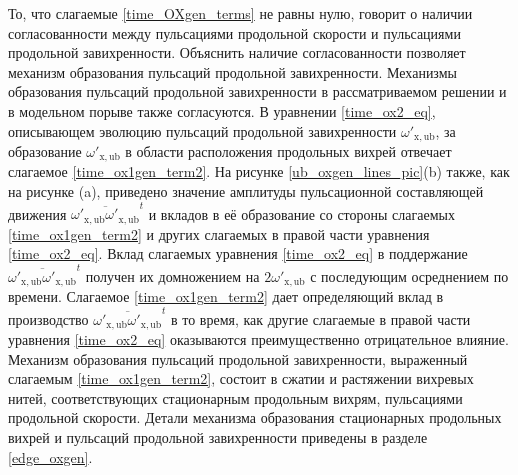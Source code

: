 То, что слагаемые \eqref{time_OXgen_terms} не равны нулю, говорит о наличии согласованности между пульсациями продольной скорости и пульсациями продольной завихренности. Объяснить наличие согласованности позволяет механизм образования пульсаций продольной завихренности. Механизмы образования пульсаций продольной завихренности в рассматриваемом решении и в модельном порыве также согласуются. В уравнении \eqref{time_ox2_eq}, описывающем эволюцию пульсаций продольной завихренности $\omega'_\mathrm{x,ub}$, за образование $\omega'_\mathrm{x,ub}$ в области расположения продольных вихрей отвечает слагаемое \eqref{time_ox1gen_term2}. На рисунке \ref{ub_oxgen_lines_pic}(b) также, как на рисунке (a), приведено значение амплитуды пульсационной составляющей движения $\overline{\omega'_\mathrm{x,ub}\omega'_\mathrm{x,ub}}^t$ и вкладов в её образование со стороны слагаемых \eqref{time_ox1gen_term2} и других слагаемых в правой части уравнения \eqref{time_ox2_eq}. Вклад слагаемых уравнения \eqref{time_ox2_eq} в поддержание $\overline{\omega'_\mathrm{x,ub}\omega'_\mathrm{x,ub}}^t$ получен их домножением на $2\omega'_\mathrm{x,ub}$ с последующим осреднением по времени. Слагаемое \eqref{time_ox1gen_term2} дает определяющий вклад в производство  $\overline{\omega'_\mathrm{x,ub}\omega'_\mathrm{x,ub}}^t$ в то время, как другие слагаемые в правой части уравнения \eqref{time_ox2_eq} оказываются преимущественно отрицательное влияние. Механизм образования пульсаций продольной завихренности, выраженный слагаемым \eqref{time_ox1gen_term2}, состоит в сжатии и растяжении вихревых нитей, соответствующих стационарным продольным вихрям, пульсациями продольной скорости. Детали механизма образования стационарных продольных вихрей и пульсаций продольной завихренности приведены в разделе \ref{edge_oxgen}.

